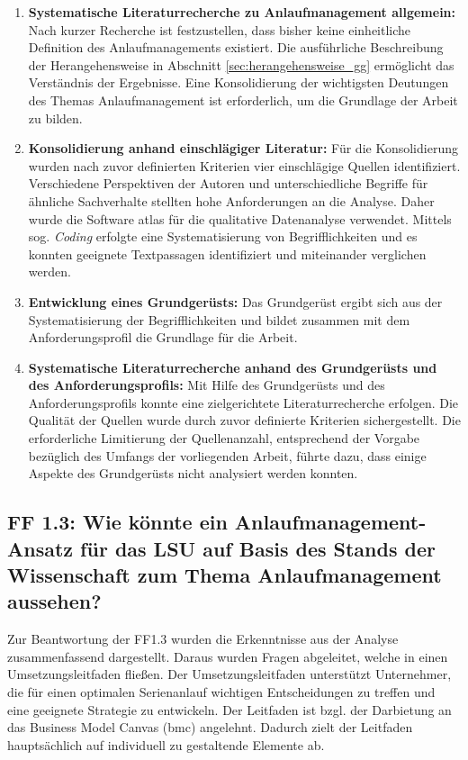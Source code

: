 \begin{enumerate}
 \item \textbf{Systematische Literaturrecherche zu Anlaufmanagement allgemein: } Nach kurzer Recherche ist festzustellen, dass bisher keine einheitliche Definition des Anlaufmanagements existiert. 
 Die ausführliche Beschreibung der Herangehensweise in Abschnitt \ref{sec:herangehensweise_gg} ermöglicht das Verständnis der Ergebnisse. 
 Eine Konsolidierung der wichtigsten Deutungen des Themas Anlaufmanagement ist erforderlich, um die Grundlage der Arbeit zu bilden. 
 \item \textbf{Konsolidierung anhand einschlägiger Literatur: } Für die Konsolidierung wurden nach zuvor definierten Kriterien vier einschlägige Quellen identifiziert. 
 Verschiedene Perspektiven der Autoren und unterschiedliche Begriffe für ähnliche Sachverhalte stellten hohe Anforderungen an die Analyse. Daher wurde die Software \gls{atlas} für die qualitative Datenanalyse verwendet. Mittels sog. \textit{Coding} erfolgte eine Systematisierung von Begrifflichkeiten und es konnten geeignete Textpassagen identifiziert und miteinander verglichen werden. 
 \item \textbf{Entwicklung eines Grundgerüsts: } Das Grundgerüst ergibt sich aus der Systematisierung der Begrifflichkeiten und bildet zusammen mit dem Anforderungsprofil die Grundlage für die Arbeit. 
 \item \textbf{Systematische Literaturrecherche anhand des Grundgerüsts und des Anforderungsprofils: } Mit Hilfe des Grundgerüsts und des Anforderungsprofils konnte eine zielgerichtete Literaturrecherche erfolgen. Die Qualität der Quellen wurde durch zuvor definierte Kriterien sichergestellt. 
 Die erforderliche Limitierung der Quellenanzahl, entsprechend der Vorgabe bezüglich des Umfangs der vorliegenden Arbeit, führte dazu, dass einige Aspekte des Grundgerüsts nicht analysiert werden konnten. 
\end{enumerate}

\subsection*{FF 1.3: Wie könnte ein Anlaufmanagement-Ansatz für das LSU auf Basis des Stands der Wissenschaft zum Thema Anlaufmanagement aussehen?}
Zur Beantwortung der FF1.3 wurden die Erkenntnisse aus der Analyse zusammenfassend dargestellt. Daraus wurden Fragen abgeleitet, welche in einen Umsetzungsleitfaden fließen. Der Umsetzungsleitfaden unterstützt Unternehmer, die für einen optimalen Serienanlauf wichtigen Entscheidungen zu treffen und eine geeignete Strategie zu entwickeln. Der Leitfaden ist bzgl. der Darbietung an das Business Model Canvas (\gls{bmc}) %
angelehnt. Dadurch zielt der Leitfaden hauptsächlich auf individuell zu gestaltende Elemente ab.

